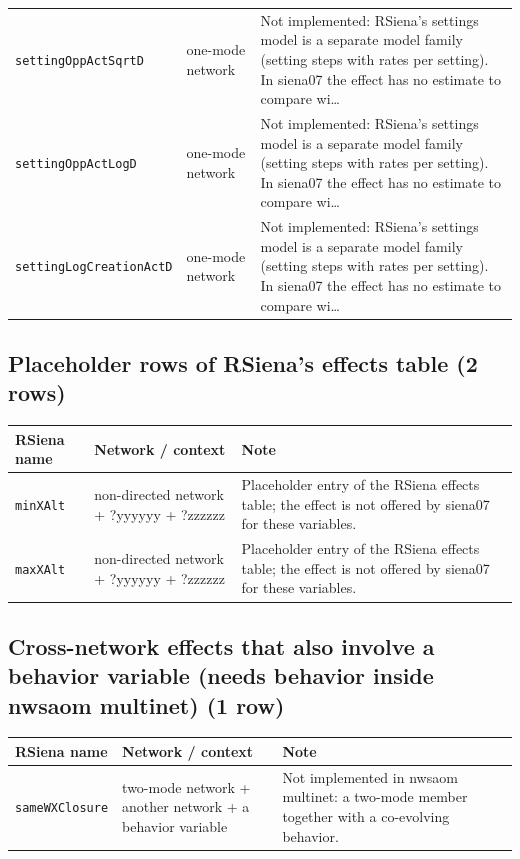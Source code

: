 \begin{longtable}{@{}p{2.8cm}p{4.6cm}p{6.5cm}@{}}
\texttt{settingOppActSqrtD} & one-mode network & Not implemented: RSiena's settings model is a separate model family (setting steps with rates per setting). In siena07 the effect has no estimate to compare wi…\\
\texttt{settingOppActLogD} & one-mode network & Not implemented: RSiena's settings model is a separate model family (setting steps with rates per setting). In siena07 the effect has no estimate to compare wi…\\
\texttt{settingLogCreationActD} & one-mode network & Not implemented: RSiena's settings model is a separate model family (setting steps with rates per setting). In siena07 the effect has no estimate to compare wi…\\
\bottomrule
\end{longtable}
\normalsize

\subsection*{Placeholder rows of RSiena's effects table (2 rows)}
\footnotesize
\begin{longtable}{@{}p{2.8cm}p{4.6cm}p{6.5cm}@{}}
\toprule
RSiena name & Network / context & Note\\
\midrule
\endhead
\texttt{minXAlt} & non-directed network + ?yyyyyy + ?zzzzzz & Placeholder entry of the RSiena effects table; the effect is not offered by siena07 for these variables.\\
\texttt{maxXAlt} & non-directed network + ?yyyyyy + ?zzzzzz & Placeholder entry of the RSiena effects table; the effect is not offered by siena07 for these variables.\\
\bottomrule
\end{longtable}
\normalsize

\subsection*{Cross-network effects that also involve a behavior variable (needs behavior inside nwsaom multinet) (1 row)}
\footnotesize
\begin{longtable}{@{}p{2.8cm}p{4.6cm}p{6.5cm}@{}}
\toprule
RSiena name & Network / context & Note\\
\midrule
\endhead
\texttt{sameWXClosure} & two-mode network + another network + a behavior variable & Not implemented in nwsaom multinet: a two-mode member together with a co-evolving behavior.\\
\bottomrule
\end{longtable}
\normalsize


